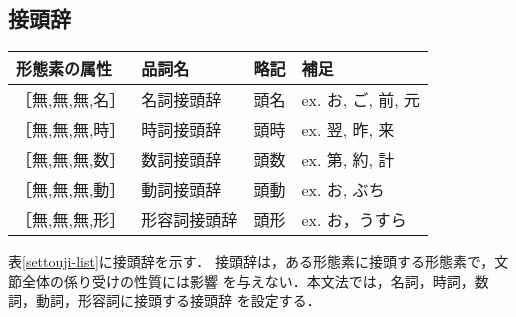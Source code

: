 \subsection{接頭辞}
\begin{table*}
\begin{center}
\begin{tabular}{|l|l|l|l|}
\hline
形態素の属性 & 品詞名 & 略記 & 補足 \\
\hline
［無,無,無,名］ & 名詞接頭辞 & 頭名 & ex. お, ご, 前, 元 \\
［無,無,無,時］ & 時詞接頭辞 & 頭時 & ex. 翌, 昨, 来 \\
［無,無,無,数］ & 数詞接頭辞 & 頭数 & ex. 第, 約, 計 \\
［無,無,無,動］ & 動詞接頭辞 & 頭動 & ex. お, ぶち \\
［無,無,無,形］ & 形容詞接頭辞 & 頭形 & ex. お，うすら \\
\hline
\end{tabular}
\end{center}
\caption{接頭辞}
\label{settouji-list}
\end{table*}

表\ref{settouji-list}に接頭辞を示す．
接頭辞は，ある形態素に接頭する形態素で，文節全体の係り受けの性質には影響
を与えない．本文法では，名詞，時詞，数詞，動詞，形容詞に接頭する接頭辞
を設定する．

